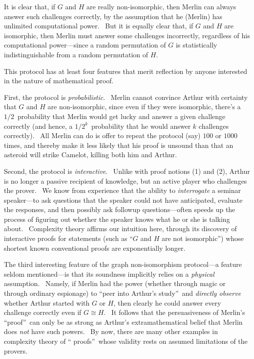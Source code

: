 \documentclass[11pt,onecolumn]{article}%
\begin{document}
It is clear that, if $G$ and $H$ are really non-isomorphic, then Merlin can
always answer such challenges correctly, by the assumption that he (Merlin)
has unlimited computational power. \ But it is equally clear that, if $G$ and
$H$ are isomorphic, then Merlin must answer some challenges incorrectly,
regardless of his computational power---since a random permutation of $G$ is
statistically indistinguishable from a random permutation of $H$.

This protocol has at least four features that merit reflection by anyone
interested in the nature of mathematical proof.

First, the protocol is \textit{probabilistic}. \ Merlin cannot convince Arthur
with certainty that $G$ and $H$ are non-isomorphic, since even if they were
isomorphic, there's a $1/2$\ probability that Merlin would get lucky and
answer a given challenge correctly (and hence, a $1/2^{k}$\ probability that
he would answer $k$ challenges correctly). \ All Merlin can do is offer to
repeat the protocol (say) $100$ or $1000$ times, and thereby make it less
likely that his proof is unsound than that an asteroid will strike Camelot,
killing both him and Arthur.

Second, the protocol is \textit{interactive}. \ Unlike with proof notions (1)
and (2), Arthur is no longer a passive recipient of knowledge, but an active
player who challenges the prover. \ We know from experience that the ability
to \textit{interrogate} a seminar speaker---to ask questions that the speaker
could not have anticipated, evaluate the responses, and then possibly ask
followup questions---often speeds up the process of figuring out whether the
speaker knows what he or she is talking about. \ Complexity theory affirms our
intuition here, through its discovery of interactive proofs for statements
(such as \textquotedblleft$G$ and $H$ are not isomorphic\textquotedblright)
whose shortest known conventional proofs are exponentially longer.

The third interesting feature of the graph non-isomorphism protocol---a
feature seldom mentioned---is that its soundness implicitly relies on a
\textit{physical} assumption. \ Namely, if Merlin had the power (whether
through magic or through ordinary espionage) to \textquotedblleft peer into
Arthur's study\textquotedblright\ and \textit{directly observe} whether Arthur
started with $G$ or $H$, then clearly he could answer every challenge
correctly even if $G\cong H$. \ It follows that the persuasiveness of Merlin's
\textquotedblleft proof\textquotedblright\ can only be as strong as Arthur's
extramathematical belief that Merlin does \textit{not} have such powers. \ By
now, there are many other examples in complexity theory of \textquotedblleft
proofs\textquotedblright\ whose validity rests on assumed limitations of the provers.
\end{document}
